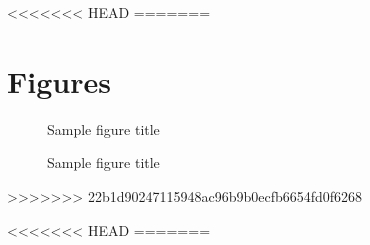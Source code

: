 \documentclass{bmcart}
\begin{document}
\begin{backmatter}




<<<<<<< HEAD
%
=======
\section*{Figures}
  \begin{figure}[h!]
  \caption{Sample figure title}
\end{figure}

\begin{figure}[h!]
  \caption{Sample figure title}
\end{figure}
>>>>>>> 22b1d90247115948ac96b9b0ecfb6654fd0f6268


<<<<<<< HEAD
=======

\end{backmatter}
\end{document}
